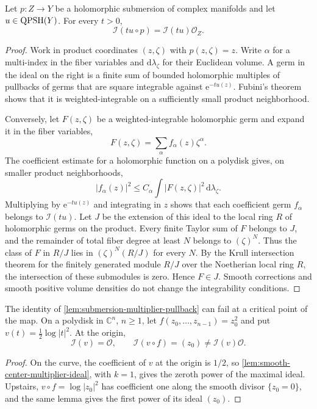 \begin{lemma}\label{lem:submersion-multiplier-pullback}
Let $p\colon Z\to Y$ be a holomorphic submersion of complex manifolds and let $u\in\mathrm{QPSH}(Y)$. For every $t>0$,
\[
 \mathcal I(tu\circ p)
       =\mathcal I(tu)\mathcal O_Z.
\]
\end{lemma}
\begin{proof}
Work in product coordinates $(z,\zeta)$ with $p(z,\zeta)=z$. Write $\alpha$ for a multi-index in the fiber variables and $\mathrm{d}\lambda_\zeta$ for their Euclidean volume. A germ in the ideal on the right is a finite sum of bounded holomorphic multiples of pullbacks of germs that are square integrable against $\mathrm{e}^{-tu(z)}$. Fubini's theorem shows that it is weighted-integrable on a sufficiently small product neighborhood.

Conversely, let $F(z,\zeta)$ be a weighted-integrable holomorphic germ and expand it in the fiber variables,
\[
 F(z,\zeta)=\sum_\alpha f_\alpha(z)\zeta^\alpha.
\]
The coefficient estimate for a holomorphic function on a polydisk gives, on smaller product neighborhoods,
\[
 |f_\alpha(z)|^2\leq C_\alpha
       \int |F(z,\zeta)|^2\,\mathrm{d}\lambda_\zeta.
\]
Multiplying by $\mathrm{e}^{-tu(z)}$ and integrating in $z$ shows that each coefficient germ $f_\alpha$ belongs to $\mathcal I(tu)$. Let $J$ be the extension of this ideal to the local ring $R$ of holomorphic germs on the product. Every finite Taylor sum of $F$ belongs to $J$, and the remainder of total fiber degree at least $N$ belongs to $(\zeta)^N$. Thus the class of $F$ in $R/J$ lies in $(\zeta)^N(R/J)$ for every $N$. By the Krull intersection theorem for the finitely generated module $R/J$ over the Noetherian local ring $R$, the intersection of these submodules is zero. Hence $F\in J$. Smooth corrections and smooth positive volume densities do not change the integrability conditions.
\end{proof}

\begin{example}\label{fibration:ramified-ideal-pullback}
The identity of \cref{lem:submersion-multiplier-pullback} can fail at a
critical point of the map. On a polydisk in $\mathbb C^n$, $n\geq1$, let
$f(z_0,\ldots,z_{n-1})=z_0^2$ and put
$v(t)=\tfrac12\log|t|^2$. At the origin,
\[
 \mathcal I(v)=\mathcal O,\qquad
 \mathcal I(v\circ f)=(z_0)
             \ne\mathcal I(v)\mathcal O.
\]
\end{example}
\begin{proof}
On the curve, the coefficient of $v$ at the origin is $1/2$, so
\cref{lem:smooth-center-multiplier-ideal}, with $k=1$, gives the
zeroth power of the maximal ideal. Upstairs,
$v\circ f=\log|z_0|^2$ has coefficient one along the smooth
divisor $\{z_0=0\}$, and the same lemma gives the first power of
its ideal $(z_0)$.
\end{proof}

